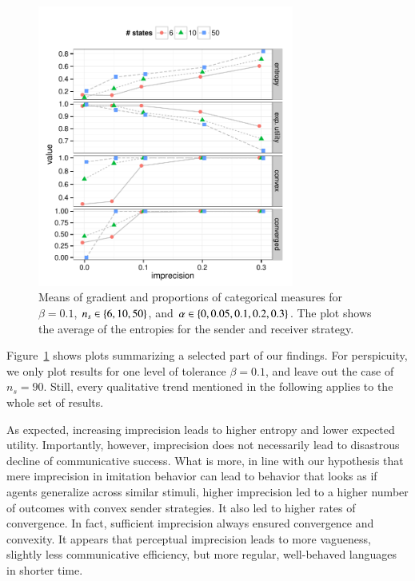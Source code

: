 \documentclass[fleqn,reqno,10pt]{article}
\newcommand{\imprecision}{\ensuremath{\alpha}} %
\newcommand{\toler}{\ensuremath{\beta}} %
\newcommand{\ns}{\ensuremath{n_s}} %
\begin{document}
\begin{figure}[t]
  \centering
  
  \includegraphics[width=0.75\textwidth]{plots/MeanMetrics3.pdf}

  \caption{Means of gradient and proportions of categorical measures
    for $\toler = 0.1$, $\ns \in \set{6, 10, 50}$, and $\imprecision
    \in \set{0, 0.05, 0.1, 0.2, 0.3}$. The plot shows the average of
    the entropies for the sender and receiver strategy.}
  \label{fig:MeanMetrics}
\end{figure}

Figure~\ref{fig:MeanMetrics} shows plots summarizing a selected part of our findings.  For
perspicuity, we only plot results for one level of tolerance $\beta = 0.1$, and leave out the
case of $n_s = 90$. Still, every qualitative trend mentioned in the following applies to the
whole set of results.

As expected, increasing imprecision leads to higher entropy and lower expected
utility. Importantly, however, imprecision does not necessarily lead to disastrous decline of
communicative success. What is more, in line with our hypothesis that mere imprecision in
imitation behavior can lead to behavior that looks as if agents generalize across similar
stimuli, higher imprecision led to a higher number of outcomes with convex sender
strategies. It also led to higher rates of convergence. In fact, sufficient imprecision always
ensured convergence and convexity. It appears that perceptual imprecision leads to more
vagueness, slightly less communicative efficiency, but more regular, well-behaved languages in
shorter time.
\end{document}
